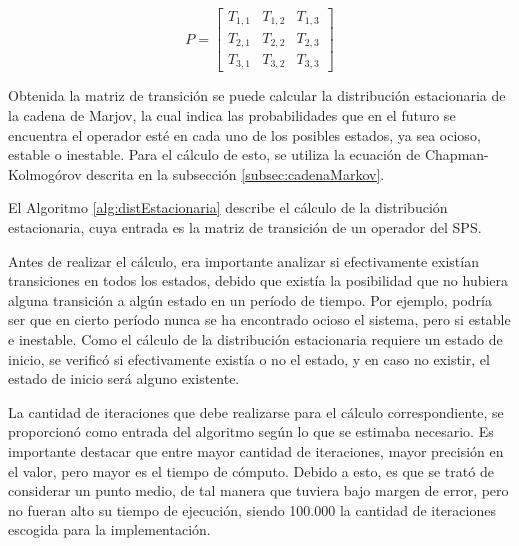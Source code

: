 \begin{equation} \label{eq:matrizTransicionPredictive}
	P =
	\begin{bmatrix}
		T_{1,1} & T_{1,2} & T_{1,3} \\
		T_{2,1} & T_{2,2} & T_{2,3} \\
		T_{3,1} & T_{3,2} & T_{3,3}
	\end{bmatrix}	
\end{equation}

Obtenida la matriz de transición se puede calcular la distribución estacionaria de la cadena de Marjov, la cual indica las probabilidades que en el futuro se encuentra el operador esté en cada uno de los posibles estados, ya sea ocioso, estable o inestable. Para el cálculo de esto, se utiliza la ecuación de Chapman-Kolmogórov \citep{Papoulis1984} descrita en la subsección \ref{subsec:cadenaMarkov}.

El Algoritmo \ref{alg:distEstacionaria} describe el cálculo de la distribución estacionaria, cuya entrada es la matriz de transición de un operador del SPS. 

Antes de realizar el cálculo, era importante analizar si efectivamente existían transiciones en todos los estados, debido que existía la posibilidad que no hubiera alguna transición a algún estado en un período de tiempo. Por ejemplo, podría ser que en cierto período nunca se ha encontrado ocioso el sistema, pero si estable e inestable. Como el cálculo de la distribución estacionaria requiere un estado de inicio, se verificó si efectivamente existía o no el estado, y en caso no existir, el estado de inicio será alguno existente.

La cantidad de iteraciones que debe realizarse para el cálculo correspondiente, se proporcionó como entrada del algoritmo según lo que se estimaba necesario. Es importante destacar que entre mayor cantidad de iteraciones, mayor precisión en el valor, pero mayor es el tiempo de cómputo. Debido a esto, es que se trató de considerar un punto medio, de tal manera que tuviera bajo margen de error, pero no fueran alto su tiempo de ejecución, siendo 100.000 la cantidad de iteraciones escogida para la implementación.

